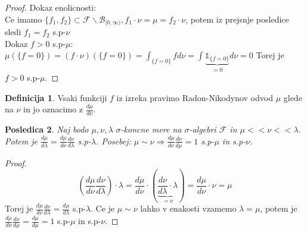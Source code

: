\documentclass[a4paper,12pt]{article}
\theoremstyle{definition} %
\newtheorem{definicija}{Definicija}[section]
\theoremstyle{plain} %
\newtheorem{posledica}[definicija]{Posledica}
\newcommand{\F}{\mathcal{F}}
\begin{document}
            \begin{proof}
                Dokaz enolicnosti:\\
                Ce imamo $\{f_1, f_2\} \subset \F\backslash\mathcal{B}_{[0, \infty)}, f_1\cdot\nu = \mu = f_2\cdot\nu$, potem iz prejsnje posledice sledi $f_1 = f_2$ s.p-$\nu$ \\
                Dokaz $f>0$ s.p-$\mu$: \\
                $\mu(\{f = 0\}) = (f\cdot\nu)(\{f = 0\}) = \int_{\{f = 0\}}fd\nu = \int\underbrace{\mathds{1}_{\{f = 0\}}}_{=0}d\nu = 0$ Torej je $f>0$ s.p-$\mu$. 
            \end{proof}

            \begin{definicija}
                Vsaki funkciji $f$ iz izreka pravimo Radon-Nikodynov odvod $\mu$ glede na $\nu$ in jo oznacimo z $\frac{d\mu}{d\nu}$.
            \end{definicija}

            \begin{posledica}
                Naj bodo $\mu, \nu, \lambda$ $\sigma$-koncne mere na $\sigma$-algebri $\F$ in $\mu << \nu << \lambda$. Potem je $\frac{d\mu}{d\lambda} = \frac{d\mu}{d\nu}\frac{d\nu}{d\lambda}$ s.p-$\lambda$. Posebej: $\mu \sim \nu \Rightarrow \frac{d\mu}{d\nu}\frac{d\nu}{d\mu} = 1$ s.p-$\mu$ in s.p-$\nu$.
            \end{posledica}

            \begin{proof}
                $$
                \left(\frac{d\mu}{d\nu}\frac{d\nu}{d\lambda}\right)\cdot\lambda = 
                \frac{d\mu}{d\nu}\cdot\left(\underbrace{\frac{d\nu}{d\lambda}\cdot\lambda}_{=\nu}\right) =
                \frac{d\mu}{d\nu}\cdot\nu = \mu
                $$
                Torej je $\frac{d\mu}{d\nu}\frac{d\nu}{d\lambda} = \frac{d\mu}{d\lambda}$ s.p-$\lambda$. Ce je $\mu \sim \nu$ lahko v enakosti vzamemo $\lambda = \mu$, potem je $\frac{d\mu}{d\nu}\frac{d\nu}{d\mu} = \frac{d\mu}{d\mu} = 1$ s.p-$\mu$ in s.p-$\nu$.
            \end{proof}
\end{document}
